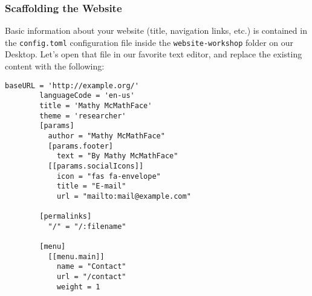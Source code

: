 \begin{frame}[fragile]
    \frametitle{Scaffolding the Website}

    Basic information about your website (title, navigation links, etc.) is contained in the \texttt{config.toml} 
    configuration file inside the \texttt{website-workshop} folder on our Desktop. Let's open that file in our favorite
    text editor, and replace the existing content with the following:

    \begin{lstlisting}[style=saneCode,gobble=8]
        baseURL = 'http://example.org/'
        languageCode = 'en-us'
        title = 'Mathy McMathFace'
        theme = 'researcher'
        [params]
          author = "Mathy McMathFace"
          [params.footer]
            text = "By Mathy McMathFace"
          [[params.socialIcons]]
            icon = "fas fa-envelope"
            title = "E-mail"
            url = "mailto:mail@example.com"
        
        [permalinks]
          "/" = "/:filename"
        
        [menu]
          [[menu.main]]
            name = "Contact"
            url = "/contact"
            weight = 1
    \end{lstlisting}
\end{frame}